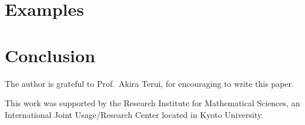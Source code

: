 \documentclass[%
  sigconf,authorversion,screen]{acmart}
\begin{document}
\section{Examples}\label{sec:examples}

\section{Conclusion}\label{sec:concl}

\begin{acks}
The author is grateful to Prof.\ Akira Terui, for encouraging  to write this paper.

This work was supported by the Research Institute for Mathematical Sciences,
an International Joint Usage/Research Center located in Kyoto University.
\end{acks}



\end{document}
